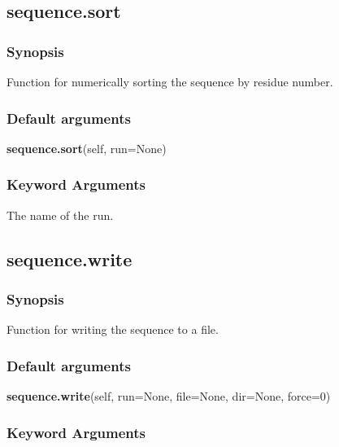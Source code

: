 


\newpage

\subsection{sequence.sort}


\subsubsection{Synopsis}

Function for numerically sorting the sequence by residue number.

\subsubsection{Default arguments}

\textsf{\textbf{sequence.sort}(self, run=None)}


\subsubsection{Keyword Arguments}

  The name of the run.


\newpage

\subsection{sequence.write}


\subsubsection{Synopsis}

Function for writing the sequence to a file.

\subsubsection{Default arguments}

\textsf{\textbf{sequence.write}(self, run=None, file=None, dir=None, force=0)}


\subsubsection{Keyword Arguments}

